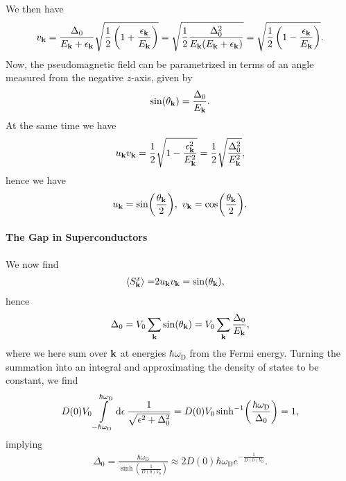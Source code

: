 We then have
\begin{align*}
	v_{\vb{k}} = \frac{\Delta_{0}}{E_{\vb{k}} + \epsilon_{\vb{k}}}\sqrt{\frac{1}{2}\left(1 + \frac{\epsilon_{\vb{k}}}{E_{\vb{k}}}\right)} = \sqrt{\frac{1}{2}\frac{\Delta_{0}^{2}}{E_{\vb{k}}(E_{\vb{k}} + \epsilon_{\vb{k}})}} = \sqrt{\frac{1}{2}\left(1 - \frac{\epsilon_{\vb{k}}}{E_{\vb{k}}}\right)}.
\end{align*}
Now, the pseudomagnetic field can be parametrized in terms of an angle measured from the negative $z$-axis, given by
\begin{align*}
	\sin(\theta_{\vb{k}}) = \frac{\Delta_{0}}{E_{\vb{k}}}.
\end{align*}
At the same time we have
\begin{align*}
	u_{\vb{k}}v_{\vb{k}} = \frac{1}{2}\sqrt{1 - \frac{\epsilon_{\vb{k}}^{2}}{E_{\vb{k}}^{2}}} = \frac{1}{2}\sqrt{\frac{\Delta_{0}^{2}}{E_{\vb{k}}^{2}}},
\end{align*}
hence we have
\begin{align*}
	u_{\vb{k}} = \sin(\frac{\theta_{\vb{k}}}{2}),\ v_{\vb{k}} = \cos(\frac{\theta_{\vb{k}}}{2}).
\end{align*}

\paragraph{The Gap in Superconductors}
We now find
\begin{align*}
	\expval{S_{\vb{k}}^{x}} =& 2u_{\vb{k}}v_{\vb{k}} = \sin(\theta_{\vb{k}}),
\end{align*}
hence
\begin{align*}
	\Delta_{0} = V_{0}\sum\limits_{\vb{k}}\sin(\theta_{\vb{k}}) = V_{0}\sum\limits_{\vb{k}}\frac{\Delta_{0}}{E_{\vb{k}}},
\end{align*}
where we here sum over $\vb{k}$ at energies $\hbar\omega_{\text{D}}$ from the Fermi energy. Turning the summation into an integral and approximating the density of states to be constant, we find
\begin{align*}
	D(0)V_{0}\int\limits_{-\hbar\omega_{\text{D}}}^{\hbar\omega_{\text{D}}}\dd{\epsilon}\frac{1}{\sqrt{\epsilon^{2} + \Delta_{0}^{2}}} = D(0)V_{0}\sinh[-1](\frac{\hbar\omega_{\text{D}}}{\Delta_{0}}) = 1,
\end{align*}
implying
\begin{align*}
	\Delta_{0} = \frac{\hbar\omega_{\text{D}}}{\sinh(\frac{1}{D(0)V_{0}})} \approx 2D(0)\hbar\omega_{\text{D}}e^{-\frac{1}{D(0)V_{0}}}.
\end{align*}

